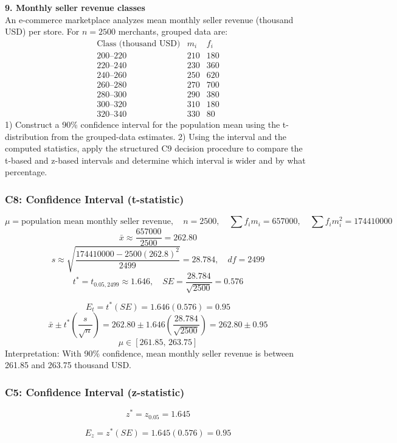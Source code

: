 \begin{ExamProblems}
		\newpage
		\item
		\textbf{9. Monthly seller revenue classes}\\
		An e-commerce marketplace analyzes mean monthly seller revenue (thousand USD) per store.
		For $n=2500$ merchants, grouped data are:
		\[
		\begin{array}{c|c|c}
		\text{Class (thousand USD)} & m_i & f_i\\\hline
		200\text{--}220 & 210 & 180\\
		220\text{--}240 & 230 & 360\\
		240\text{--}260 & 250 & 620\\
		260\text{--}280 & 270 & 700\\
		280\text{--}300 & 290 & 380\\
		300\text{--}320 & 310 & 180\\
		320\text{--}340 & 330 & 80
		\end{array}
		\]
		1) Construct a 90\% confidence interval for the population mean using the t-distribution from the grouped-data estimates.
		2) Using the interval and the computed statistics, apply the structured C9 decision procedure to compare the t-based and z-based intervals and determine which interval is wider and by what percentage.

		\subsubsection*{C8: Confidence Interval (t-statistic)}
		\[
		\mu=\text{population mean monthly seller revenue},\quad n=2500,\quad \sum f_im_i=657000,\quad \sum f_im_i^2=174410000
		\]
		\[
		\bar{x}\approx\frac{657000}{2500}=262.80
		\]
		\[
		s\approx\sqrt{\frac{174410000-2500(262.8)^2}{2499}}=28.784,\quad df=2499
		\]
		\[
		t^*=t_{0.05,2499}\approx 1.646,\quad SE=\frac{28.784}{\sqrt{2500}}=0.576
		\]

		\[
		E_t=t^*(SE)=1.646(0.576)=0.95
		\]
		\[
		\bar{x}\pm t^*\left(\frac{s}{\sqrt{n}}\right)=262.80\pm 1.646\left(\frac{28.784}{\sqrt{2500}}\right)=262.80\pm 0.95
		\]
		\[
		\mu\in[261.85,\,263.75]
		\]
		Interpretation: With 90\% confidence, mean monthly seller revenue is between 261.85 and 263.75 thousand USD.

		\subsubsection*{C5: Confidence Interval (z-statistic)}
		\[
		z^*=z_{0.05}=1.645
		\]

		\[
		E_z=z^*(SE)=1.645(0.576)=0.95
		\]


\end{ExamProblems}
